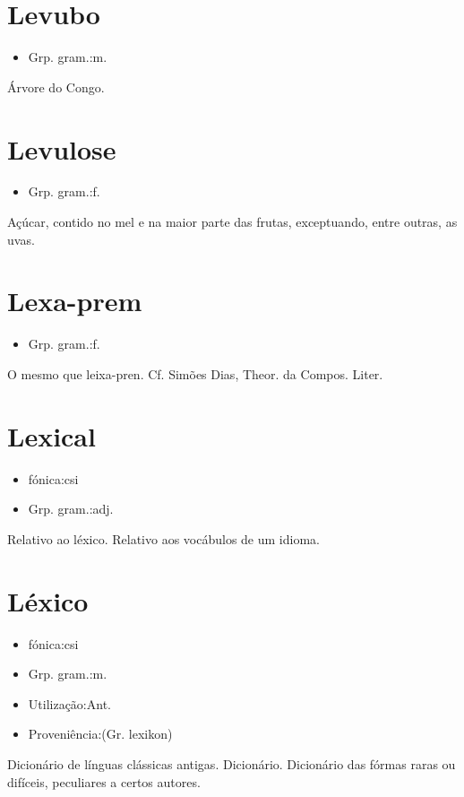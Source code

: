 \section{Levubo}
\begin{itemize}
\item {Grp. gram.:m.}
\end{itemize}
Árvore do Congo.
\section{Levulose}
\begin{itemize}
\item {Grp. gram.:f.}
\end{itemize}
Açúcar, contido no mel e na maior parte das frutas, exceptuando, entre outras, as uvas.
\section{Lexa-prem}
\begin{itemize}
\item {Grp. gram.:f.}
\end{itemize}
O mesmo que \textunderscore leixa-pren\textunderscore . Cf. Simões Dias, \textunderscore Theor. da Compos. Liter\textunderscore .
\section{Lexical}
\begin{itemize}
\item {fónica:csi}
\end{itemize}
\begin{itemize}
\item {Grp. gram.:adj.}
\end{itemize}
Relativo ao léxico.
Relativo aos vocábulos de um idioma.
\section{Léxico}
\begin{itemize}
\item {fónica:csi}
\end{itemize}
\begin{itemize}
\item {Grp. gram.:m.}
\end{itemize}
\begin{itemize}
\item {Utilização:Ant.}
\end{itemize}
\begin{itemize}
\item {Proveniência:(Gr. \textunderscore lexikon\textunderscore )}
\end{itemize}
Dicionário de línguas clássicas antigas.
Dicionário.
Dicionário das fórmas raras ou difíceis, peculiares a certos autores.
